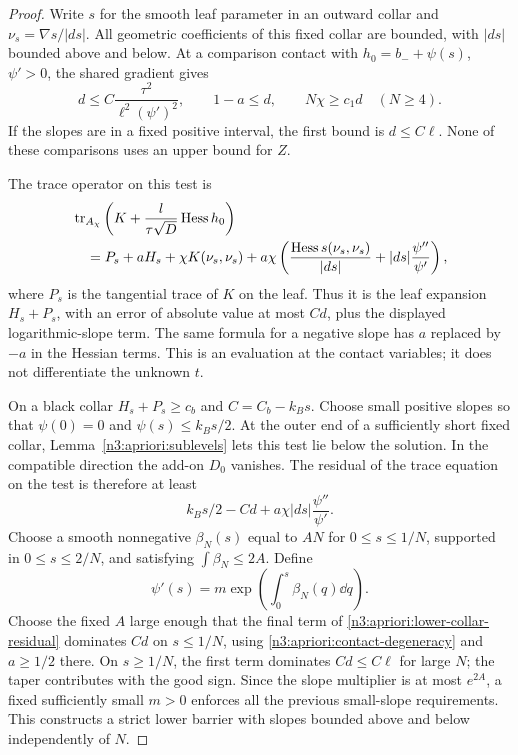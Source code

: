 \begin{proof}
Write $s$ for the smooth leaf parameter in an outward collar and
$\nu_s=\nabla s/|ds|$.  All geometric coefficients of this fixed collar
are bounded, with $|ds|$ bounded above and below.  At a comparison
contact with $h_0=b_-+\psi(s)$, $\psi'>0$, the shared gradient gives
\begin{equation}
 d\le C\frac{\tau^2}{\ell^2(\psi')^2},\qquad
 1-a\le d,\qquad N\chi\ge c_1d\quad(N\ge4).
 \label{n3:apriori:contact-degeneracy}
\end{equation}
If the slopes are in a fixed positive interval, the first bound is
$d\le C\ell$.  None of these comparisons uses an upper bound for $Z$.

The trace operator on this test is
\begin{align}
 &\operatorname{tr}_{A_\chi}\left(K+
       \frac{l}{\tau\sqrt D}\operatorname{Hess} h_0\right)\notag\\
 &\quad=P_s+aH_s+\chi K(\nu_s,\nu_s)
       +a\chi\left(
           \frac{\operatorname{Hess} s(\nu_s,\nu_s)}{|ds|}
                      +|ds|\frac{\psi''}{\psi'}\right),
 \label{n3:apriori:collar-trace}
\end{align}
where $P_s$ is the tangential trace of $K$ on the leaf.  Thus it is
the leaf expansion $H_s+P_s$, with an error of absolute value at most
$C d$, plus the displayed logarithmic-slope term.  The same formula
for a negative slope has $a$ replaced by $-a$ in the Hessian terms.
This is an evaluation at the contact variables; it does not
differentiate the unknown $t$.

On a black collar $H_s+P_s\ge c_b$ and $C=C_b-k_Bs$.
Choose small positive slopes so that $\psi(0)=0$ and
$\psi(s)\le k_Bs/2$.  At the outer end of a sufficiently short fixed
collar, Lemma~\ref{n3:apriori:sublevels} lets this test lie below the
solution.  In the compatible direction the add-on $D_0$ vanishes.
The residual of the trace equation on the test is therefore at least
\begin{equation}
 k_Bs/2-Cd+a\chi|ds|\frac{\psi''}{\psi'}.
 \label{n3:apriori:lower-collar-residual}
\end{equation}
Choose a smooth nonnegative $\beta_N(s)$ equal to $AN$ for
$0\le s\le1/N$, supported in $0\le s\le2/N$, and satisfying
$\int\beta_N\le2A$.  Define
\[
 \psi'(s)=m\exp\left(\int_0^s\beta_N(q)\dd q\right).
\]
Choose the fixed $A$ large enough that the final term of
\eqref{n3:apriori:lower-collar-residual} dominates $Cd$ on $s\le1/N$,
using \eqref{n3:apriori:contact-degeneracy} and $a\ge1/2$ there.
On $s\ge1/N$, the first term dominates $Cd\le C\ell$ for large $N$;
the taper contributes with the good sign.  Since the slope multiplier
is at most $e^{2A}$, a fixed sufficiently small $m>0$ enforces all
the previous small-slope requirements.  This constructs a strict
lower barrier with slopes bounded above and below independently of
$N$.


\end{proof}
